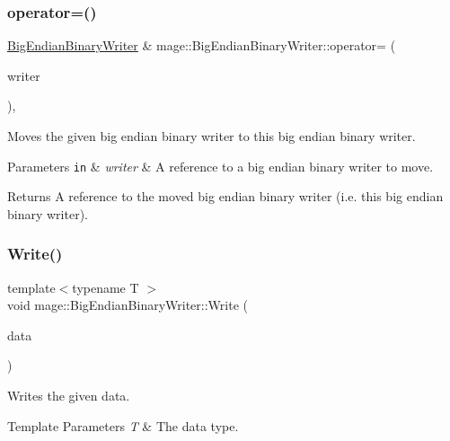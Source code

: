 \subsubsection{\texorpdfstring{operator=()}{operator=()}\hspace{0.1cm}{\footnotesize\ttfamily [2/2]}}
{\footnotesize\ttfamily \mbox{\hyperlink{classmage_1_1_big_endian_binary_writer}{Big\+Endian\+Binary\+Writer}} \& mage\+::\+Big\+Endian\+Binary\+Writer\+::operator= (\begin{DoxyParamCaption}\item[{\mbox{\hyperlink{classmage_1_1_big_endian_binary_writer}{Big\+Endian\+Binary\+Writer}} \&\&}]{writer }\end{DoxyParamCaption})\hspace{0.3cm}{\ttfamily [default]}, {\ttfamily [noexcept]}}

Moves the given big endian binary writer to this big endian binary writer.


\begin{DoxyParams}[1]{Parameters}
\mbox{\tt in}  & {\em writer} & A reference to a big endian binary writer to move. \\
\hline
\end{DoxyParams}
\begin{DoxyReturn}{Returns}
A reference to the moved big endian binary writer (i.\+e. this big endian binary writer). 
\end{DoxyReturn}
\mbox{\label{classmage_1_1_big_endian_binary_writer_ae8bab2d7022672e1d30991c1288d981c}} 
\subsubsection{\texorpdfstring{Write()}{Write()}}
{\footnotesize\ttfamily template$<$typename T $>$ \\
void mage\+::\+Big\+Endian\+Binary\+Writer\+::\+Write (\begin{DoxyParamCaption}\item[{const T \&}]{data }\end{DoxyParamCaption})\hspace{0.3cm}{\ttfamily [protected]}}

Writes the given data.


\begin{DoxyTemplParams}{Template Parameters}
{\em T} & The data type. \\
\hline
\end{DoxyTemplParams}

